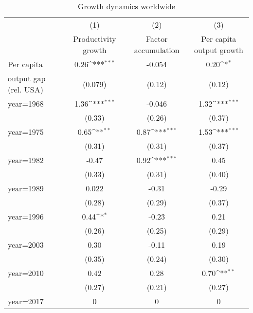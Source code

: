\begin{table}[htbp]\centering
\def\sym#1{\ifmmode^{#1}\else\(^{#1}\)\fi}
\caption{Growth dynamics worldwide}
\begin{tabular}{l*{3}{c}}
\toprule
                &\multicolumn{1}{c}{(1)}&\multicolumn{1}{c}{(2)}&\multicolumn{1}{c}{(3)}\\
                &\multicolumn{1}{c}{Productivity growth}&\multicolumn{1}{c}{Factor accumulation}&\multicolumn{1}{c}{Per capita output growth}\\
\midrule
Per capita      &     0.26\sym{***}&   -0.054         &     0.20\sym{*}  \\
output gap (rel. USA)&  (0.079)         &   (0.12)         &   (0.12)         \\
\addlinespace
year=1968       &     1.36\sym{***}&   -0.046         &     1.32\sym{***}\\
                &   (0.33)         &   (0.26)         &   (0.37)         \\
\addlinespace
year=1975       &     0.65\sym{**} &     0.87\sym{***}&     1.53\sym{***}\\
                &   (0.31)         &   (0.31)         &   (0.37)         \\
\addlinespace
year=1982       &    -0.47         &     0.92\sym{***}&     0.45         \\
                &   (0.33)         &   (0.31)         &   (0.40)         \\
\addlinespace
year=1989       &    0.022         &    -0.31         &    -0.29         \\
                &   (0.28)         &   (0.29)         &   (0.37)         \\
\addlinespace
year=1996       &     0.44\sym{*}  &    -0.23         &     0.21         \\
                &   (0.26)         &   (0.25)         &   (0.29)         \\
\addlinespace
year=2003       &     0.30         &    -0.11         &     0.19         \\
                &   (0.35)         &   (0.24)         &   (0.30)         \\
\addlinespace
year=2010       &     0.42         &     0.28         &     0.70\sym{**} \\
                &   (0.27)         &   (0.21)         &   (0.27)         \\
\addlinespace
year=2017       &        0         &        0         &        0         \\

\end{tabular}
\end{table}
